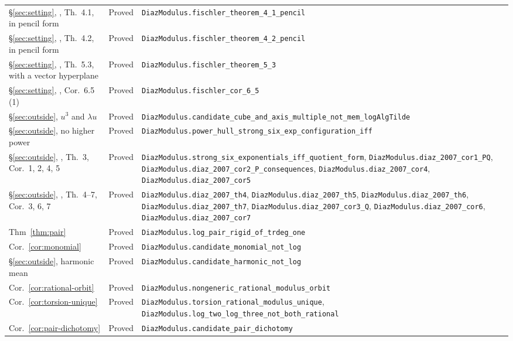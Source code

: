 \documentclass[11pt,a4paper]{article}
\theoremstyle{plain}
\theoremstyle{definition}
\begin{document}
\begin{center}
\begin{longtable}{@{}llp{6.2cm}@{}}
\S\ref{sec:setting}, \cite{fischler-2001}, Th.~4.1, in pencil form & Proved & \nolinkurl{DiazModulus.fischler_theorem_4_1_pencil} \\
\S\ref{sec:setting}, \cite{fischler-2001}, Th.~4.2, in pencil form & Proved & \nolinkurl{DiazModulus.fischler_theorem_4_2_pencil} \\
\S\ref{sec:setting}, \cite{fischler-2001}, Th.~5.3, with a vector hyperplane & Proved & \nolinkurl{DiazModulus.fischler_theorem_5_3} \\
\S\ref{sec:setting}, \cite{fischler-2001}, Cor.~6.5\,(1) & Proved & \nolinkurl{DiazModulus.fischler_cor_6_5} \\
\S\ref{sec:outside}, $u^{3}$ and $\lambda u$ & Proved & \nolinkurl{DiazModulus.candidate_cube_and_axis_multiple_not_mem_logAlgTilde} \\
\S\ref{sec:outside}, no higher power & Proved & \nolinkurl{DiazModulus.power_hull_strong_six_exp_configuration_iff} \\
\S\ref{sec:outside}, \cite{diaz-2007}, Th.~3, Cor.~1, 2, 4, 5 & Proved & \nolinkurl{DiazModulus.strong_six_exponentials_iff_quotient_form}, \nolinkurl{DiazModulus.diaz_2007_cor1_PQ}, \nolinkurl{DiazModulus.diaz_2007_cor2_P_consequences}, \nolinkurl{DiazModulus.diaz_2007_cor4}, \nolinkurl{DiazModulus.diaz_2007_cor5} \\
\S\ref{sec:outside}, \cite{diaz-2007}, Th.~4--7, Cor.~3, 6, 7 & Proved & \nolinkurl{DiazModulus.diaz_2007_th4}, \nolinkurl{DiazModulus.diaz_2007_th5}, \nolinkurl{DiazModulus.diaz_2007_th6}, \nolinkurl{DiazModulus.diaz_2007_th7}, \nolinkurl{DiazModulus.diaz_2007_cor3_Q}, \nolinkurl{DiazModulus.diaz_2007_cor6}, \nolinkurl{DiazModulus.diaz_2007_cor7} \\
Thm~\ref{thm:pair} & Proved & \nolinkurl{DiazModulus.log_pair_rigid_of_trdeg_one} \\
Cor.~\ref{cor:monomial} & Proved & \nolinkurl{DiazModulus.candidate_monomial_not_log} \\
\S\ref{sec:outside}, harmonic mean & Proved & \nolinkurl{DiazModulus.candidate_harmonic_not_log} \\
Cor.~\ref{cor:rational-orbit} & Proved & \nolinkurl{DiazModulus.nongeneric_rational_modulus_orbit} \\
Cor.~\ref{cor:torsion-unique} & Proved & \nolinkurl{DiazModulus.torsion_rational_modulus_unique}, \nolinkurl{DiazModulus.log_two_log_three_not_both_rational} \\
Cor.~\ref{cor:pair-dichotomy} & Proved & \nolinkurl{DiazModulus.candidate_pair_dichotomy} \\

\end{longtable}
\end{center}
\end{document}
